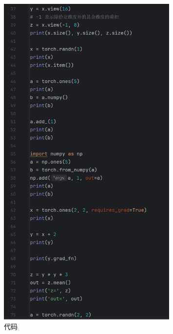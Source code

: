 \documentclass{article}
\begin{document}
\begin{figure}[htbp]
\centering
\includegraphics[width=0.8\textwidth]{2.png}
\caption{代码}
\end{figure}
\end{document}
